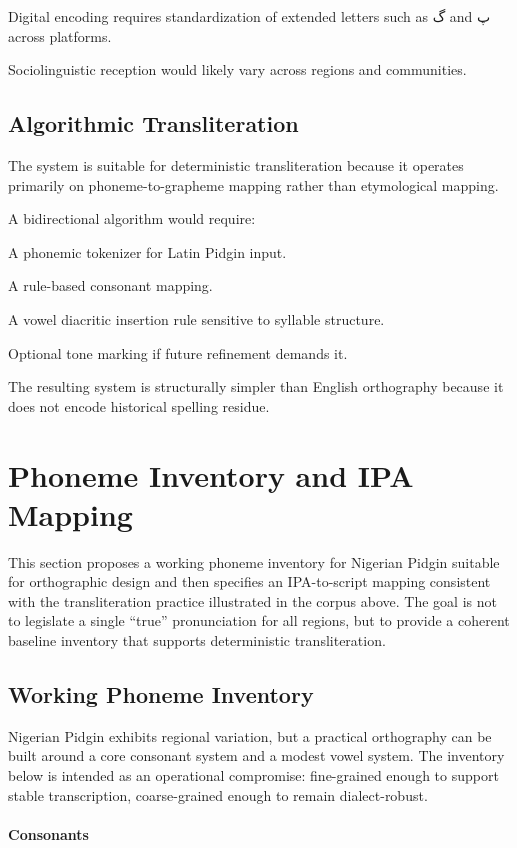 \documentclass[12pt]{article}
\begin{document}
Digital encoding requires standardization of extended letters such as گ and پ across platforms.

Sociolinguistic reception would likely vary across regions and communities.

\subsection{Algorithmic Transliteration}

The system is suitable for deterministic transliteration because it operates primarily on phoneme-to-grapheme mapping rather than etymological mapping.

A bidirectional algorithm would require:

A phonemic tokenizer for Latin Pidgin input.

A rule-based consonant mapping.

A vowel diacritic insertion rule sensitive to syllable structure.

Optional tone marking if future refinement demands it.

The resulting system is structurally simpler than English orthography because it does not encode historical spelling residue.

\section{Phoneme Inventory and IPA Mapping}

This section proposes a working phoneme inventory for Nigerian Pidgin suitable for orthographic design and then specifies an IPA-to-script mapping consistent with the transliteration practice illustrated in the corpus above. The goal is not to legislate a single ``true'' pronunciation for all regions, but to provide a coherent baseline inventory that supports deterministic transliteration.

\subsection{Working Phoneme Inventory}

Nigerian Pidgin exhibits regional variation, but a practical orthography can be built around a core consonant system and a modest vowel system. The inventory below is intended as an operational compromise: fine-grained enough to support stable transcription, coarse-grained enough to remain dialect-robust.

\paragraph{Consonants}
\end{document}
